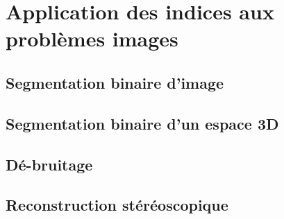 \documentclass[../main/These_Mathias_Paget.tex]{subfiles}
\begin{document}


\section{Application des indices aux problèmes images}
\label{s:application_index}

\subsection{Segmentation binaire d'image}

\subsection{Segmentation binaire d'un espace 3D}

\subsection{Dé-bruitage}

\subsection{Reconstruction stéréoscopique}




\end{document}
